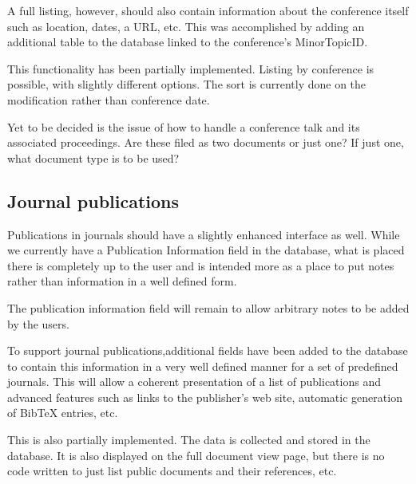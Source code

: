 \documentclass[12pt]{article}
\begin{document}
A full listing, however, should also contain information about the conference
itself such as location, dates, a URL, etc. This was accomplished by adding
an additional table to the database linked to the conference's MinorTopicID.

This functionality has been partially implemented. Listing by conference is
possible, with slightly different options. The sort is currently done on the
modification rather than conference date. 

Yet to be decided is the issue of how to handle a conference talk and its
associated proceedings. Are these filed as two documents or just one? If just
one, what document type is to be used?

\subsection{Journal publications}

Publications in journals should have a slightly enhanced interface as well.
While we currently have a Publication Information field in the database, what is
placed there is completely up to the user and is intended more as a place to put
notes rather than information in a well defined form. 

The publication information field will remain to allow arbitrary notes to be
added by the users.

To support journal publications,additional fields have been added to
the database to contain this information in a very well defined manner
for a set of predefined journals. This will allow a coherent presentation of a
list of publications and advanced features such as links to the publisher's web
site, automatic generation of BibTeX entries, etc.

This is also partially implemented. The data is collected and stored in the
database. It is also displayed on the full document view page, but there is no
code written to just list public documents and their references, etc.


                                                                                      
\end{document}
